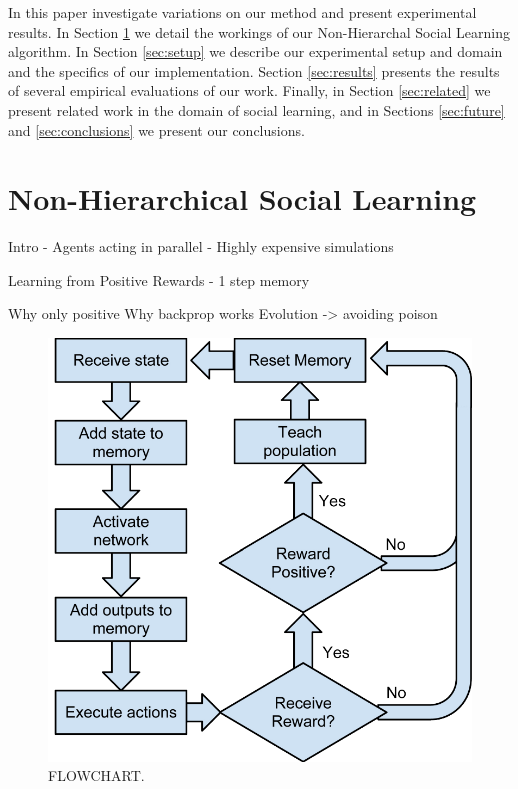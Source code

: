 \documentclass{acm_proc_article-sp}
\begin{document}
In this paper investigate variations on our method and present experimental results. 
 In Section \ref{sec:nhsl} we detail the workings of our Non-Hierarchal Social Learning algorithm.
In Section \ref{sec:setup} we describe our experimental setup and domain and the specifics of our implementation.
Section \ref{sec:results} presents the results of several empirical evaluations of our work.
Finally, in Section \ref{sec:related} we present related work in the domain of social learning, and in Sections \ref{sec:future} and \ref{sec:conclusions} we present our conclusions.

\section{Non-Hierarchical Social Learning}
\label{sec:nhsl}
Intro
    - Agents acting in parallel
    - Highly expensive simulations
    
Learning from Positive Rewards
    - 1 step memory

Why only positive
    Why backprop works
    Evolution -> avoiding poison

\begin{figure}
  \centering
    \includegraphics[scale=.6]{flowchart.pdf}
  \caption{FLOWCHART.}
  \label{fig:flowchart}
\end{figure}
\end{document}
